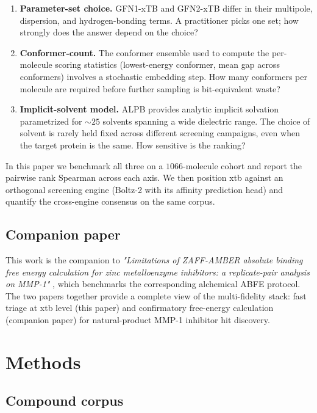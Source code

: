 \documentclass[11pt,a4paper]{article}
\begin{document}
\begin{enumerate}[leftmargin=*]
  \item \textbf{Parameter-set choice.} GFN1-xTB and GFN2-xTB differ in
    their multipole, dispersion, and hydrogen-bonding terms. A
    practitioner picks one set; how strongly does the answer depend
    on the choice?
  \item \textbf{Conformer-count.} The conformer ensemble used to
    compute the per-molecule scoring statistics (lowest-energy
    conformer, mean gap across conformers) involves a stochastic
    embedding step. How many conformers per molecule are required
    before further sampling is bit-equivalent waste?
  \item \textbf{Implicit-solvent model.} ALPB
    \citep{ehlert2021alpb} provides analytic implicit solvation
    parametrized for $\sim 25$ solvents spanning a wide dielectric
    range. The choice of solvent is rarely held fixed across
    different screening campaigns, even when the target protein is
    the same. How sensitive is the ranking?
\end{enumerate}

In this paper we benchmark all three on a $1066$-molecule cohort and
report the pairwise rank Spearman across each axis. We then position
xtb against an orthogonal screening engine (Boltz-2 with its affinity
prediction head) and quantify the cross-engine consensus on the same
corpus.

\subsection{Companion paper}

This work is the companion to \emph{"Limitations of ZAFF-AMBER
absolute binding free energy calculation for zinc metalloenzyme
inhibitors: a replicate-pair analysis on MMP-1"} \citep{paper_a_2026},
which benchmarks the corresponding alchemical ABFE protocol. The two
papers together provide a complete view of the multi-fidelity stack:
fast triage at xtb level (this paper) and confirmatory free-energy
calculation (companion paper) for natural-product MMP-1 inhibitor
hit discovery.

\section{Methods}
\label{sec:methods}

\subsection{Compound corpus}
\end{document}
